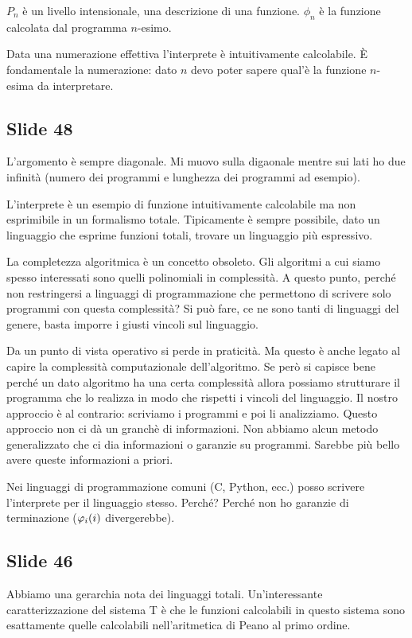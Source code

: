 $P_{n}$ è un livello intensionale, una descrizione di una funzione. $\phi_{n}$ è la funzione calcolata
dal programma $n$-esimo.

Data una numerazione effettiva l'interprete è intuitivamente calcolabile. È fondamentale la
numerazione: dato $n$ devo poter sapere qual'è la funzione $n$-esima da interpretare.

\subsection{Slide 48}

L'argomento è sempre diagonale. Mi muovo sulla digaonale mentre sui lati ho due infinità (numero
dei programmi e lunghezza dei programmi ad esempio).

L'interprete è un esempio di funzione intuitivamente calcolabile ma non esprimibile in un formalismo
totale. Tipicamente è sempre possibile, dato un linguaggio che esprime funzioni totali, trovare un
linguaggio più espressivo.

La completezza algoritmica è un concetto obsoleto. Gli algoritmi a cui siamo spesso interessati sono
quelli polinomiali in complessità. A questo punto, perché non restringersi a linguaggi di
programmazione che permettono di scrivere solo programmi con questa complessità? Si può fare, ce ne
sono tanti di linguaggi del genere, basta imporre i giusti vincoli sul linguaggio.

Da un punto di vista operativo si perde in praticità. Ma questo è anche legato al capire la
complessità computazionale dell'algoritmo. Se però si capisce bene perché un dato algoritmo ha
una certa complessità allora possiamo strutturare il programma che lo realizza in modo che rispetti
i vincoli del linguaggio. Il nostro approccio è al contrario: scriviamo i programmi e poi li
analizziamo. Questo approccio non ci dà un granchè di informazioni. Non abbiamo alcun metodo
generalizzato che ci dia informazioni o garanzie su programmi. Sarebbe più bello avere queste
informazioni a priori.

Nei linguaggi di programmazione comuni (C, Python, ecc.) posso scrivere l'interprete per il
linguaggio stesso. Perché? Perché non ho garanzie di terminazione ($\varphi_{i}(i)$ divergerebbe).

\subsection{Slide 46}

Abbiamo una gerarchia nota dei linguaggi totali. Un'interessante caratterizzazione del sistema T è
che le funzioni calcolabili in questo sistema sono esattamente quelle calcolabili nell'aritmetica di
Peano al primo ordine.

